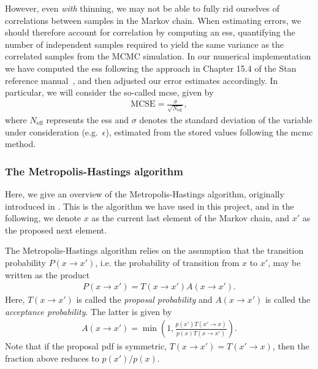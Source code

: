 \documentclass[english,notitlepage,reprint]{revtex4-2}  %
\begin{document}
However, even \textit{with} thinning, we may not be able to fully rid ourselves of correlations between samples in the Markov chain.
When estimating errors, we should therefore account for correlation by computing an \gls{ess}, quantifying the number of independent samples required to yield the same variance as the correlated samples from the MCMC simulation.
In our numerical implementation we have computed the \gls{ess} following the approach in Chapter 15.4 of the Stan reference manual~\cite{Stan}, and then adjusted our error estimates accordingly.
In particular, we will consider the so-called \gls{mcse}, given by  
\begin{align}
    \text{MCSE} = \frac{\sigma}{\sqrt{N_{\text{eff}}}},
\end{align}
where \(N_{\text{eff}}\) represents the \gls{ess} and \(\sigma\) denotes the standard deviation of the variable under consideration (e.g.~\(\epsilon\)), estimated from the stored values following the \gls{mcmc} method. 

\subsubsection{The Metropolis-Hastings algorithm}    \label{sec:Metropolis-Hastings}
Here, we give an overview of the Metropolis-Hastings algorithm, originally introduced in \cite{Metropolis1953}.
This is the algorithm we have used in this project, and in the following, we denote \(x\) as the current last element of the Markov chain, and \(x'\) as the proposed next element.

The Metropolis-Hastings algorithm relies on the assumption that the transition probability \(P(x\rightarrow x')\), i.e. the probability of transition from \(x\) to \(x'\), may be written as the product
\begin{align}
    P(x\rightarrow x') = T(x\rightarrow x') A(x\rightarrow x').
\end{align}
Here, \(T(x\rightarrow x')\) is called the \emph{proposal probability} and \(A(x\rightarrow x')\) is called the \emph{acceptance probability}.
The latter is given by 
\begin{align}
    A(x\rightarrow x') = \min\left(1, \frac{p(x')T(x'\rightarrow x)}{p(x)T(x\rightarrow x')}\right).    \label{eq:acceptance_probability}
\end{align}
Note that if the proposal \gls{pdf} is symmetric, \(T(x\rightarrow x')=T(x'\rightarrow x)\), then the fraction above reduces to \(p(x')/p(x)\).
\end{document}
